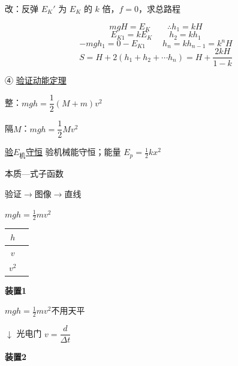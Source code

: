 \begin{problem}
改：反弹 $E_K'$ 为 $E_K$ 的 $k$ 倍，$f=0$，求总路程 %
\begin{solution}
\[
mgH=E_K\qquad \therefore h_1=kH
\]
\[
E_{K1}=kE_K\qquad h_2=kh_1
\]
\[
-mgh_1=0-E_{K1}\qquad h_n=kh_{n-1}=k^nH
\]
\[
S=H+2(h_1+h_2+\cdots h_n)=H+\frac{2kH}{1-k}
\]
\end{solution}
\end{problem}
④ \underline{验证动能定理}

整：$mgh=\dfrac{1}{2}(M+m)v^2$\quad {}

隔$M$：$mgh=\dfrac{1}{2}Mv^2$\quad {}

 \underline{验$E_{\text{机}}$守恒} %
验机械能守恒；能量 $E_p=\frac{1}{2}kx^2$

\hspace{2em}本质—式子函数

\hspace{2em}验证$\to$图像$\to$直线

$mgh=\frac{1}{2}mv^2$


\begin{center}
\begin{tabular}{|c|p{6cm}|}
\hline
$h$ & \\
\hline
$v$ & \\
\hline
$v^2$ & \\
\hline
\end{tabular}
\end{center}

\textbf{装置1}


$mgh=\frac{1}{2}mv^2$\quad 不用天平

$\downarrow$ 光电门 $v=\dfrac{d}{\Delta t}$

\textbf{装置2}


